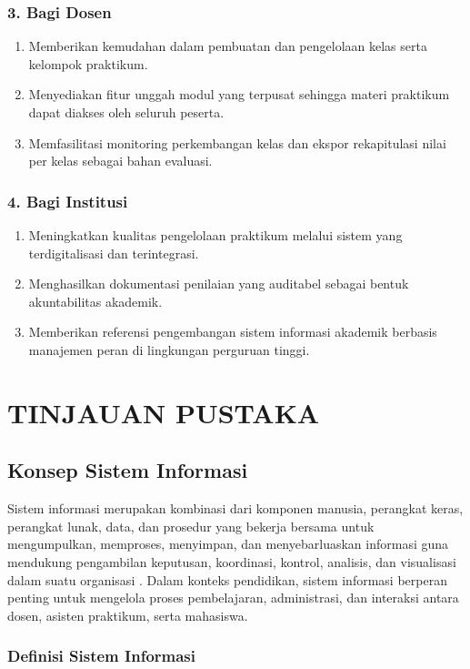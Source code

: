 \documentclass[12pt,a4paper,twoside]{report}
\begin{document}
\subsection*{3. Bagi Dosen}
\begin{enumerate}[label=\alph*.]
    \item Memberikan kemudahan dalam pembuatan dan pengelolaan kelas serta kelompok praktikum.
    \item Menyediakan fitur unggah modul yang terpusat sehingga materi praktikum dapat diakses oleh seluruh peserta.
    \item Memfasilitasi monitoring perkembangan kelas dan ekspor rekapitulasi nilai per kelas sebagai bahan evaluasi.
\end{enumerate}

\subsection*{4. Bagi Institusi}
\begin{enumerate}[label=\alph*.]
    \item Meningkatkan kualitas pengelolaan praktikum melalui sistem yang terdigitalisasi dan terintegrasi.
    \item Menghasilkan dokumentasi penilaian yang auditabel sebagai bentuk akuntabilitas akademik.
    \item Memberikan referensi pengembangan sistem informasi akademik berbasis manajemen peran di lingkungan perguruan tinggi.
\end{enumerate}
\chapter{TINJAUAN PUSTAKA}

\section{Konsep Sistem Informasi}

Sistem informasi merupakan kombinasi dari komponen manusia, perangkat keras, perangkat lunak, data, dan prosedur yang bekerja bersama untuk mengumpulkan, memproses, menyimpan, dan menyebarluaskan informasi guna mendukung pengambilan keputusan, koordinasi, kontrol, analisis, dan visualisasi dalam suatu organisasi \cite{laudon2016}. Dalam konteks pendidikan, sistem informasi berperan penting untuk mengelola proses pembelajaran, administrasi, dan interaksi antara dosen, asisten praktikum, serta mahasiswa.

\subsection{Definisi Sistem Informasi}
\end{document}
